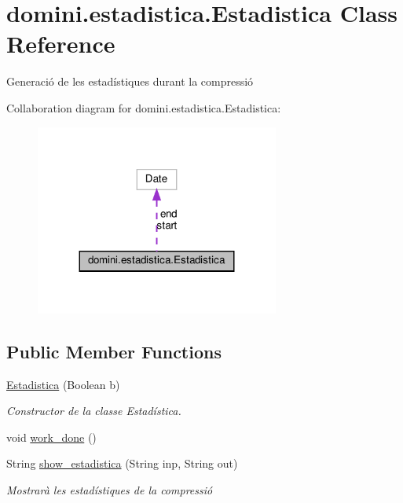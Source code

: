 \hypertarget{classdomini_1_1estadistica_1_1Estadistica}{}\section{domini.\+estadistica.\+Estadistica Class Reference}
\label{classdomini_1_1estadistica_1_1Estadistica}


Generació de les estadístiques durant la compressió  




Collaboration diagram for domini.\+estadistica.\+Estadistica\+:\nopagebreak
\begin{figure}[H]
\begin{center}
\leavevmode
\includegraphics[width=227pt]{classdomini_1_1estadistica_1_1Estadistica__coll__graph}
\end{center}
\end{figure}
\subsection*{Public Member Functions}
\begin{DoxyCompactItemize}
\item 
\hyperlink{classdomini_1_1estadistica_1_1Estadistica_aab5e956c9a7e31945ddf93cb4f332746}{Estadistica} (Boolean b)
\begin{DoxyCompactList}\small\item\em Constructor de la classe Estadística. \end{DoxyCompactList}\item 
void \hyperlink{classdomini_1_1estadistica_1_1Estadistica_a2fb112c0f85d0a831b858a994731497c}{work\+\_\+done} ()
\item 
String \hyperlink{classdomini_1_1estadistica_1_1Estadistica_a6cac6971be817fd985afb8f3b6725464}{show\+\_\+estadistica} (String inp, String out)
\begin{DoxyCompactList}\small\item\em Mostrarà les estadístiques de la compressió \end{DoxyCompactList}\end{DoxyCompactItemize}

